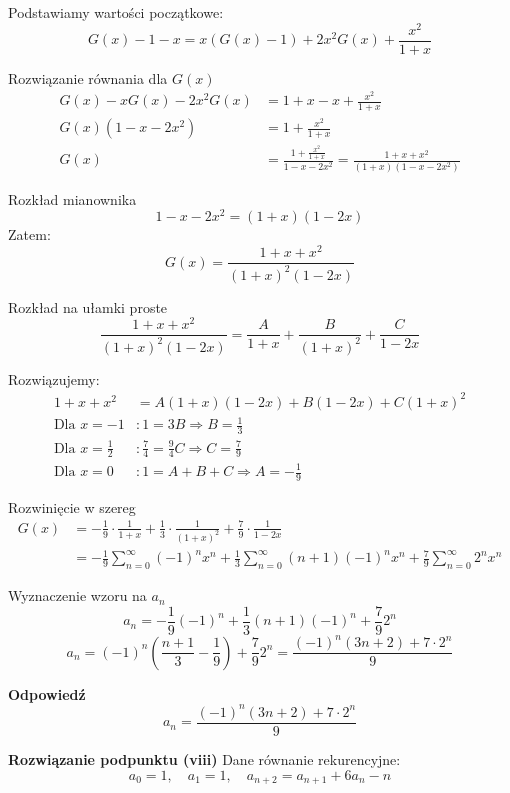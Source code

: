 \documentclass{mwart}
\begin{document}
\begin{mdframed}
    Podstawiamy wartości początkowe:
    \[ G(x) - 1 - x = x(G(x) - 1) + 2x^2 G(x) + \frac{x^2}{1 + x} \]
        
    Rozwiązanie równania dla $G(x)$
    \begin{align*}
    G(x) - x G(x) - 2x^2 G(x) &= 1 + x - x + \frac{x^2}{1 + x} \\
    G(x)(1 - x - 2x^2) &= 1 + \frac{x^2}{1 + x} \\
    G(x) &= \frac{1 + \frac{x^2}{1 + x}}{1 - x - 2x^2} = \frac{1 + x + x^2}{(1 + x)(1 - x - 2x^2)}
    \end{align*}
        
    Rozkład mianownika
    \[ 1 - x - 2x^2 = (1 + x)(1 - 2x) \]
    Zatem:
    \[ G(x) = \frac{1 + x + x^2}{(1 + x)^2 (1 - 2x)} \]
        
    Rozkład na ułamki proste
    \[ \frac{1 + x + x^2}{(1 + x)^2 (1 - 2x)} = \frac{A}{1 + x} + \frac{B}{(1 + x)^2} + \frac{C}{1 - 2x} \]
        
    Rozwiązujemy:
    \begin{align*}
    1 + x + x^2 &= A(1 + x)(1 - 2x) + B(1 - 2x) + C(1 + x)^2 \\
    \text{Dla } x = -1 &: 1 = 3B \Rightarrow B = \frac{1}{3} \\
    \text{Dla } x = \frac{1}{2} &: \frac{7}{4} = \frac{9}{4}C \Rightarrow C = \frac{7}{9} \\
    \text{Dla } x = 0 &: 1 = A + B + C \Rightarrow A = -\frac{1}{9}
    \end{align*}
        
    Rozwinięcie w szereg
    \begin{align*}
    G(x) &= -\frac{1}{9}\cdot\frac{1}{1 + x} + \frac{1}{3}\cdot\frac{1}{(1 + x)^2} + \frac{7}{9}\cdot\frac{1}{1 - 2x} \\
    &= -\frac{1}{9} \sum_{n=0}^\infty (-1)^n x^n + \frac{1}{3} \sum_{n=0}^\infty (n+1)(-1)^n x^n + \frac{7}{9} \sum_{n=0}^\infty 2^n x^n
    \end{align*}
        
    Wyznaczenie wzoru na $a_n$
    \[ a_n = -\frac{1}{9}(-1)^n + \frac{1}{3}(n+1)(-1)^n + \frac{7}{9}2^n \]
    \[ a_n = (-1)^n\left(\frac{n+1}{3} - \frac{1}{9}\right) + \frac{7}{9}2^n = \frac{(-1)^n(3n + 2) + 7\cdot 2^n}{9} \]

    \textbf{Odpowiedź}
    \[ \boxed{a_n = \frac{(-1)^n (3n + 2) + 7 \cdot 2^n}{9}} \]

    \textbf{Rozwiązanie podpunktu (viii)}
    Dane równanie rekurencyjne:
    \[
    a_{0} = 1, \quad a_{1} = 1, \quad a_{n+2} = a_{n+1} + 6a_{n} - n
    \]


\end{mdframed}
\end{document}
